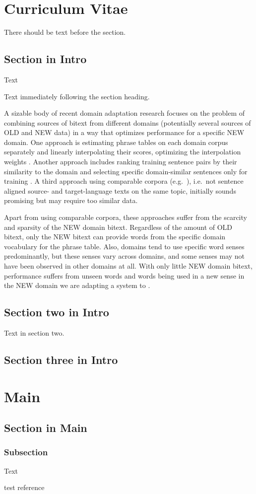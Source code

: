 \documentclass[svgnames]{report}
\newlength\tablength        \setlength\tablength{20pt}
\newlength\ruledepth        \setlength\ruledepth{2pt}
\newlength\rulelength       \setlength\rulelength{0.95\textwidth}
\newlength\tabheight        \setlength\tabheight{0.25in} \addtolength\tabheight{-\ruledepth}
\newlength\raisetitle       \setlength\raisetitle{1ex}
\newlength\insettitle       \setlength\insettitle{1.5em}
\newlength\afterheadingskip \setlength\afterheadingskip{9ex}
\newcommand\problems{%
  \par\noindent
  \begin{tikzpicture} [remember picture,overlay]
      \node[yshift=0.2em-1em-11pt-11pt,xshift=-2cm] at (0,0) %
      {
      \bfseries\Large\sffamily
      \begin{tikzpicture}[remember picture, overlay]
        \fill[fill=LightSkyBlue] (0,0) rectangle
          (\paperwidth,0.2cm);
        \node[anchor=west,yshift=2ex+0.2cm-1.5pt,xshift=2.5pt,rectangle,
              rounded corners=0pt,inner sep=11pt,
              fill=MidnightBlue]
              {\hspace*{-11pt}\hspace*{-3pt}\hspace*{2cm}\color{white} Something in a rect};
       \end{tikzpicture}
      };

  \end{tikzpicture}%
  \\[\afterheadingskip]
}
\begin{document}
\chapter{Curriculum Vitae}
There should be text before the section.

\section{Section in Intro}
Text


Text immediately following the section heading.

A sizable body of recent domain adaptation research focuses on the problem of combining sources of bitext from different domains (potentially several sources of OLD and NEW data) in a way that optimizes performance for a specific NEW domain.
One approach is estimating phrase tables on each domain corpus separately and linearly interpolating their scores, optimizing the interpolation weights \cite{foster2007mixture}. Another approach includes ranking training sentence pairs by their similarity to the domain and selecting specific domain-similar sentences only for training \cite{axelrod2011domain}. A third approach using comparable corpora (e.g.\ \cite{daume2011domain}), i.e.\ not sentence aligned source- and target-language texts on the same topic, initially sounds promising but may require too similar data.

Apart from using comparable corpora, these approaches suffer from the scarcity and sparsity of the NEW domain bitext. Regardless of the amount of OLD bitext, only the NEW bitext can provide words from the specific domain vocabulary for the phrase table. Also, domains tend to use specific word senses predominantly, but these senses vary across domains, and some senses may not have been observed in other domains at all. %
With only little NEW domain bitext, performance suffers from unseen words and words being used in a new sense in the NEW domain we are adapting a system to \cite{irvine2013measuring}. %

\section{Section two in Intro}
Text in section two.

\section{Section three in Intro}


\chapter{Main}
\section{Section in Main}
\subsection{Subsection}
Text
\begin{thebibliography}{99}
 test reference
\end{thebibliography}
\end{document}
